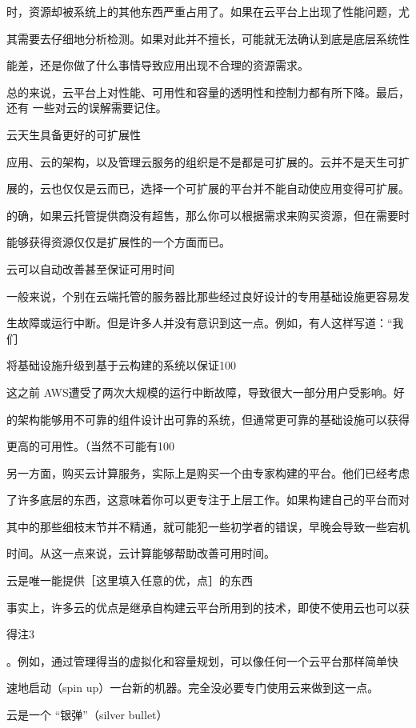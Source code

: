 时，资源却被系统上的其他东西严重占用了。如果在云平台上出现了性能问题，尤

其需要去仔细地分析检测。如果对此并不擅长，可能就无法确认到底是底层系统性

能差，还是你做了什么事情导致应用出现不合理的资源需求。

总的来说，云平台上对性能、可用性和容量的透明性和控制力都有所下降。最后，还有
一些对云的误解需要记住。

云天生具备更好的可扩展性

应用、云的架构，以及管理云服务的组织是不是都是可扩展的。云并不是天生可扩

展的，云也仅仅是云而已，选择一个可扩展的平台并不能自动使应用变得可扩展。

的确，如果云托管提供商没有超售，那么你可以根据需求来购买资源，但在需要时

能够获得资源仅仅是扩展性的一个方面而已。

云可以自动改善甚至保证可用时间

一般来说，个别在云端托管的服务器比那些经过良好设计的专用基础设施更容易发

生故障或运行中断。但是许多人并没有意识到这一点。例如，有人这样写道：“我们

将基础设施升级到基于云构建的系统以保证100%

这之前 AWS遭受了两次大规模的运行中断故障，导致很大一部分用户受影响。好

的架构能够用不可靠的组件设计出可靠的系统，但通常更可靠的基础设施可以获得

更高的可用性。（当然不可能有100%

另一方面，购买云计算服务，实际上是购买一个由专家构建的平台。他们已经考虑

了许多底层的东西，这意味着你可以更专注于上层工作。如果构建自己的平台而对

其中的那些细枝末节并不精通，就可能犯一些初学者的错误，早晚会导致一些宕机

时间。从这一点来说，云计算能够帮助改善可用时间。

云是唯一能提供［这里填入任意的优，点］的东西

事实上，许多云的优点是继承自构建云平台所用到的技术，即使不使用云也可以获

得注3

。例如，通过管理得当的虚拟化和容量规划，可以像任何一个云平台那样简单快

速地启动（spin up）一台新的机器。完全没必要专门使用云来做到这一点。

云是一个 “银弹”（silver bullet）

